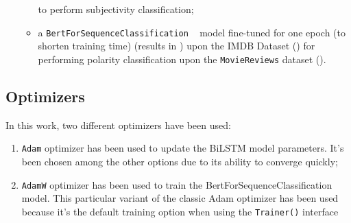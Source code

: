\begin{itemize}
\begin{itemize}
\begin{enumerate}
                \end{enumerate}
                to perform subjectivity classification;

            \item a \texttt{BertForSequenceClassification} ~\cite{sequence} model fine-tuned for one epoch 
                (to shorten training time) (results in \textbf{}) upon the IMDB Dataset (\textbf{}) for performing polarity classification 
                upon the \texttt{MovieReviews} dataset (\textbf{}).

        \end{itemize}
\end{itemize}

\vspace{-0.5cm}
\subsection{Optimizers}
\label{subsec:opt}
In this work, two different optimizers have been used:
\begin{enumerate}
    \item \texttt{Adam} optimizer has been used to update the BiLSTM model parameters. It's been chosen among the other options due to
        its ability to converge quickly;
    \item \texttt{AdamW} optimizer has been used to train the BertForSequenceClassification model. This particular variant of the classic 
        Adam optimizer has been used because it's the default training option when using the \texttt{Trainer()} interface ~\cite{trainer} 
\end{enumerate}

\vspace{-0.25cm}
